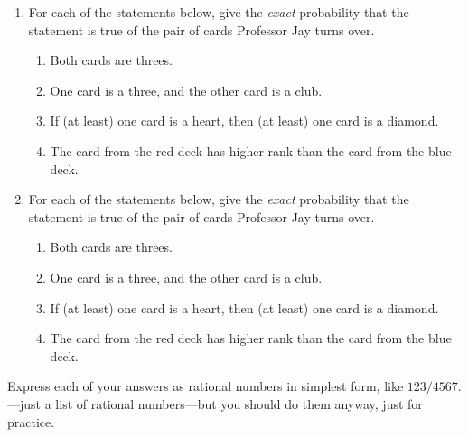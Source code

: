 \documentclass[11pt]{article}
\begin{document}
\begin{enumerate}
\begin{enumerate}
\item
For each of the statements below, give the \emph{exact} probability that the statement is true of the  pair of cards Professor Jay turns over.
\begin{enumerate}
\item
Both cards are threes.
\item
One card is a three, and the other card is a club.
\item
If (at least) one card is a heart, then (at least) one card is a diamond.
\item
The card from the red deck has higher rank than the card from the blue deck.
\end{enumerate}

\item
For each of the statements below, give the \emph{exact} probability that the statement is true of the  pair of cards Professor Jay turns over.
\begin{enumerate}
\item
Both cards are threes.
\item
One card is a three, and the other card is a club.
\item
If (at least) one card is a heart, then (at least) one card is a diamond.
\item
The card from the red deck has higher rank than the card from the blue deck.
\end{enumerate}
\end{enumerate}
Express each of your answers as rational numbers in simplest form, like $123/4567$.  ---just a list of rational numbers---but you should do them anyway, just for practice.



\end{enumerate}
\end{document}
